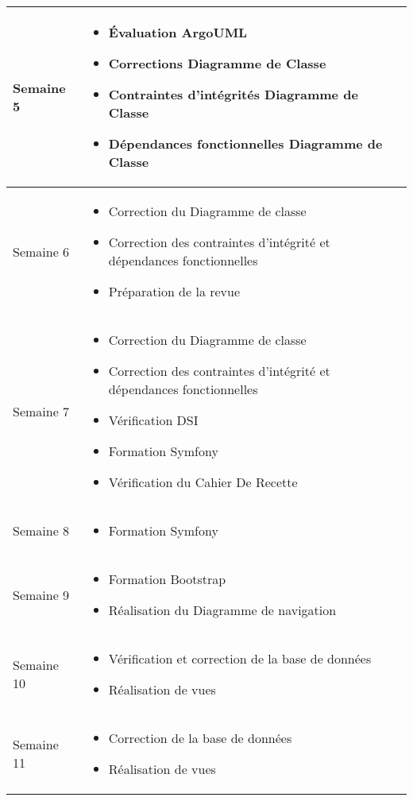 \documentclass [a4paper] {article}
\begin{document}
\section*{\Julie}

\centering
	\begin{longtable}{|>{\columncolor{gray!40}}p{2cm}|p{12cm}|}
	\hline
	Semaine 5 & \begin{itemize}
	\item Évaluation ArgoUML
	\item Corrections Diagramme de Classe
	\item Contraintes d'intégrités Diagramme de Classe
	\item Dépendances fonctionnelles Diagramme de Classe
	\end{itemize} \\
	\hline
	Semaine 6 & \begin{itemize}
	\item Correction du Diagramme de classe
	\item Correction des contraintes d'intégrité et dépendances fonctionnelles
	\item Préparation de la revue
	\end{itemize} \\
	\hline
	Semaine 7 & \begin{itemize}
	\item Correction du Diagramme de classe
	\item Correction des contraintes d'intégrité et dépendances fonctionnelles
	\item Vérification DSI
	\item Formation Symfony 
	\item Vérification du Cahier De Recette
	\end{itemize} \\
	\hline
	Semaine 8 & \begin{itemize}
	\item Formation Symfony 
	\end{itemize} \\
	\hline
	Semaine 9 & \begin{itemize}
	\item Formation Bootstrap
	\item Réalisation du Diagramme de navigation
	\end{itemize} \\
	\hline
	Semaine 10 & \begin{itemize}
	\item Vérification et correction de la base de données
	\item Réalisation de vues
	\end{itemize} \\
	\hline
	Semaine 11 & \begin{itemize}
	\item Correction de la base de données
	\item Réalisation de vues 
	\end{itemize} \\
	\hline
\end{longtable}
\end{document}
